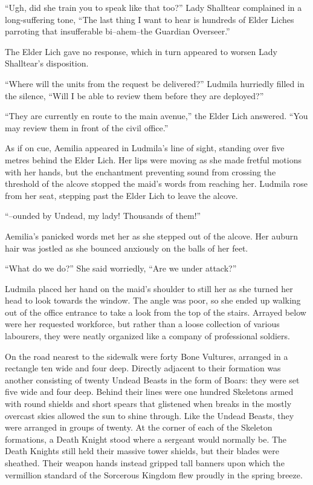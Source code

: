  

“Ugh, did she train you to speak like that too?” Lady Shalltear complained in a long-suffering tone, “The last thing I want to hear is hundreds of Elder Liches parroting that insufferable bi–ahem–the Guardian Overseer.”

 

The Elder Lich gave no response, which in turn appeared to worsen Lady Shalltear’s disposition.

 

“Where will the units from the request be delivered?” Ludmila hurriedly filled in the silence, “Will I be able to review them before they are deployed?”

 

“They are currently en route to the main avenue,” the Elder Lich answered. “You may review them in front of the civil office.”

 

As if on cue, Aemilia appeared in Ludmila’s line of sight, standing over five metres behind the Elder Lich. Her lips were moving as she made fretful motions with her hands, but the enchantment preventing sound from crossing the threshold of the alcove stopped the maid’s words from reaching her. Ludmila rose from her seat, stepping past the Elder Lich to leave the alcove.

 

“–ounded by Undead, my lady! Thousands of them!”

 

Aemilia’s panicked words met her as she stepped out of the alcove. Her auburn hair was jostled as she bounced anxiously on the balls of her feet.

 

“What do we do?” She said worriedly, “Are we under attack?”

 

Ludmila placed her hand on the maid’s shoulder to still her as she turned her head to look towards the window. The angle was poor, so she ended up walking out of the office entrance to take a look from the top of the stairs. Arrayed below were her requested workforce, but rather than a loose collection of various labourers, they were neatly organized like a company of professional soldiers.

 

On the road nearest to the sidewalk were forty Bone Vultures, arranged in a rectangle ten wide and four deep. Directly adjacent to their formation was another consisting of twenty Undead Beasts in the form of Boars: they were set five wide and four deep. Behind their lines were one hundred Skeletons armed with round shields and short spears that glistened when breaks in the mostly overcast skies allowed the sun to shine through. Like the Undead Beasts, they were arranged in groups of twenty. At the corner of each of the Skeleton formations, a Death Knight stood where a sergeant would normally be. The Death Knights still held their massive tower shields, but their blades were sheathed. Their weapon hands instead gripped tall banners upon which the vermillion standard of the Sorcerous Kingdom flew proudly in the spring breeze.

